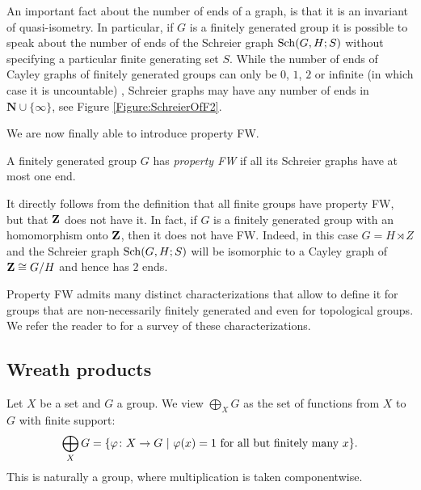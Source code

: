 An important fact about the number of ends of a graph, is that it is an invariant of quasi-isometry. In particular, if $G$ is a finitely generated group it is possible to speak about the number of ends of the Schreier graph $\operatorname{Sch}(G,H;S)$ without specifying a particular finite generating set $S$.
While the number of ends of Cayley graphs of finitely generated groups can only be $0$, $1$, $2$ or infinite (in which case it is uncountable) \cite{}, Schreier graphs may have any number of ends in $\mathbf N\cup\{\infty\}$, see Figure \ref{Figure:SchreierOfF2}.

We are now finally able to introduce property FW.
%
%
\begin{defn}
A finitely generated group $G$ has \emph{property FW} if all its Schreier graphs have at most one end.
\end{defn}
%
%
It directly follows from the definition that all finite groups have property FW, but that $\mathbf{Z}$ does not have it.
In fact, if $G$ is a finitely generated group with an homomorphism onto $\mathbf{Z}$, then it does not have FW. Indeed, in this case $G=H\rtimes Z$ and the Schreier graph $\operatorname{Sch}(G,H;S)$ will be isomorphic to a Cayley graph of $\mathbf{Z}\cong G/H$ and hence has $2$ ends.

Property FW admits many distinct characterizations that allow to define it for groups that are non-necessarily finitely generated and even for topological groups. We refer the reader to \cite{Cornulier2013} for a survey of these characterizations.
%
%
%
%
%
%
%
%
%
%
\subsection{Wreath products}
%
%
%
%
%
Let $X$ be a set and $G$ a group. We view 
$\bigoplus_XG$ as the set of functions from $X$ to $G$ with finite support:
\[
	\bigoplus_XG=\{\varphi\colon X\to G\ |\ \varphi(x)=1 \textnormal{ for all but finitely many }x\}.
\]
This is naturally a group, where multiplication is taken componentwise.

